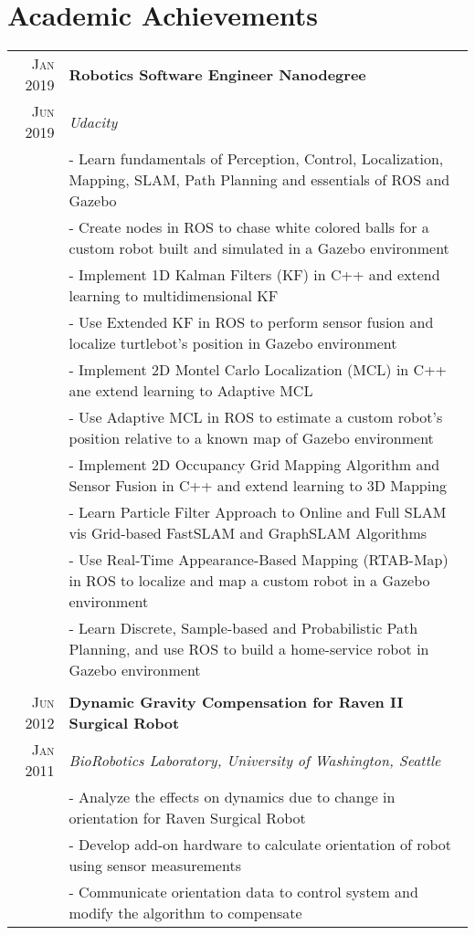 \documentclass[letter,10pt]{article}
\begin{document}
\section{Academic Achievements}
\begin{tabular}{r|p{16cm}}

\textsc{Jan 2019} & \textbf{Robotics Software Engineer Nanodegree}\\
\textsc{Jun 2019}&\emph{Udacity}\\
&\footnotesize{
 - Learn fundamentals of Perception, Control, Localization, Mapping, SLAM, Path Planning and essentials of ROS and Gazebo
}\\
&\footnotesize{
 - Create nodes in ROS to chase white colored balls for a custom robot built and simulated in a Gazebo environment
}\\
&\footnotesize{
 - Implement 1D Kalman Filters (KF) in C++ and extend learning to multidimensional KF
}\\
&\footnotesize{
 - Use Extended KF in ROS to perform sensor fusion and localize turtlebot's position in Gazebo environment
}\\
&\footnotesize{
 - Implement 2D Montel Carlo Localization (MCL) in C++ ane extend learning to Adaptive MCL
}\\
&\footnotesize{
 - Use Adaptive MCL in ROS to estimate a custom robot's position relative to a known map of Gazebo environment
}\\
&\footnotesize{
 - Implement 2D Occupancy Grid Mapping Algorithm and Sensor Fusion in C++ and extend learning to 3D Mapping
}\\
&\footnotesize{
 - Learn Particle Filter Approach to Online and Full SLAM vis Grid-based FastSLAM and GraphSLAM Algorithms
}\\
&\footnotesize{
 - Use Real-Time Appearance-Based Mapping (RTAB-Map) in ROS to localize and map a custom robot in a Gazebo environment
}\\
&\footnotesize{
  - Learn Discrete, Sample-based and Probabilistic Path Planning, and use ROS to build a home-service robot in Gazebo environment
}\\

\multicolumn{2}{c}{} \\

\textsc{Jun 2012} & \textbf{Dynamic Gravity Compensation for Raven II Surgical Robot}\\
\textsc{Jan 2011}&\emph{BioRobotics Laboratory, University of Washington, Seattle}\\
&\footnotesize{
 - Analyze the effects on dynamics due to change in orientation for Raven Surgical Robot
}\\
&\footnotesize{
 - Develop add-on hardware to calculate orientation of robot using sensor measurements
}\\
&\footnotesize{
 - Communicate orientation data to control system and modify the algorithm to compensate
}\\


\end{tabular}
\end{document}
